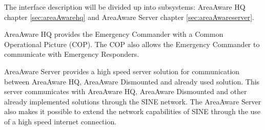 The interface description will be divided up into subsystems: AreaAware HQ chapter \ref{sec:areaAwarehq} and AreaAware Server chapter \ref{sec:areaAwareserver}.

AreaAware HQ provides the Emergency Commander with a Common Operational Picture (COP). The COP also allows the Emergency Commander to communicate with Emergency Responders.

AreaAware Server provides a high speed server solution for communication between AreaAware HQ, AreaAware Dismounted and already used solution. This server communicates with AreaAware HQ, AreaAware Dismounted and other already implemented solutions through the SINE network. The AreaAware Server also makes it possible to extend the network capabilities of SINE through the use of a high speed internet connection.
